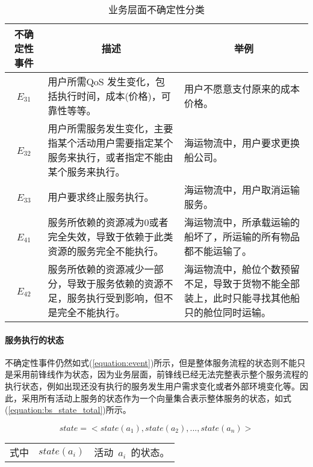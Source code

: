 \begin{table}[htbp]
    \caption{业务层面不确定性分类}
    \vspace{-0.5em}\label{table:bs_uc_type}\centering{}
    \begin{tabularx}{\textwidth}{cXX}
        \toprule
        不确定性事件  & \multicolumn{1}{c}{描述} & \multicolumn{1}{c}{举例} \\
        \midrule
        ~$E_{31}$~ & 用户所需QoS 发生变化，包括执行时间，成本(价格)，可靠性等等。& 用户不愿意支付原来的成本价格。  \\
        ~$E_{32}$~ & 用户所需服务发生变化，主要指某个活动用户需要指定某个服务来执行，或者指定不能由某个服务来执行。& 海运物流中，用户要求更换船公司。\\
        ~$E_{33}$~ & 用户要求终止服务执行。 & 海运物流中，用户取消运输服务。\\
        ~$E_{41}$~ & 服务所依赖的资源减为0或者完全失效，导致于依赖于此类资源的服务完全不能执行。 &海运物流中，所承载运输的船坏了，所运输的所有物品都不能运输了。\\
        ~$E_{42}$~ & 服务所依赖的资源减少一部分，导致于服务依赖的资源不足，服务执行受到影响，但不是完全不能执行。
        & 海运物流中，舱位个数预留不足，导致于货物不能全部装上，此时只能寻找其他船只的舱位同时运输。\\

        \bottomrule
    \end{tabularx}%
\end{table}%

\paragraph{服务执行的状态} 
不确定性事件仍然如式(\ref{equation:event})所示，但是整体服务流程的状态则不能只是采用前锋线作为状态，因为业务层面，前锋线已经无法完整表示整个服务流程的执行状态，例如出现还没有执行的服务发生用户需求变化或者外部环境变化等。因此，采用所有活动上服务的状态作为一个向量集合表示整体服务的状态，如式(\ref{equation:bs_state_total})所示。

\begin{equation}\label{equation:bs_state_total}
state = < state(a_1),state(a_2),..., state(a_n)>
\end{equation}
\begin{tabularx}{\textwidth}{@{}l@{\quad}l@{\pozhehao }X@{}}
    式中
    & $state(a_i)$ & 活动~$a_i$~的状态。
\end{tabularx}\vspace{\wordsep}

